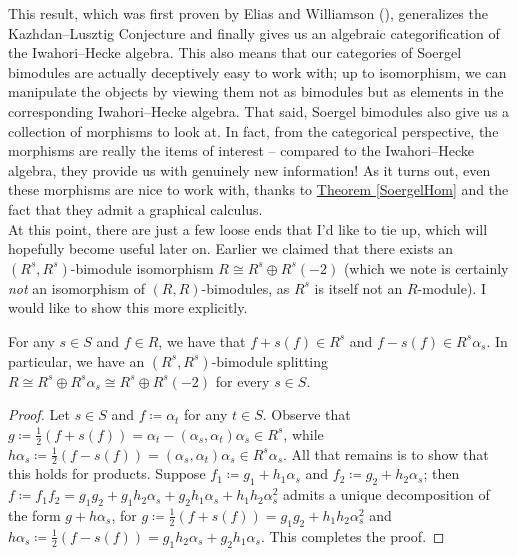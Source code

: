 \noindent This result, which was first proven by Elias and Williamson (\cite[Theorem 1.1]{EW14}), generalizes the Kazhdan--Lusztig Conjecture and finally gives us an algebraic categorification of the Iwahori--Hecke algebra. This also means that our categories of Soergel bimodules are actually deceptively easy to work with; up to isomorphism, we can manipulate the objects by viewing them not as bimodules but as elements in the corresponding Iwahori--Hecke algebra. That said, Soergel bimodules also give us a collection of morphisms to look at. In fact, from the categorical perspective, the morphisms are really the items of interest -- compared to the Iwahori--Hecke algebra, they provide us with genuinely new information! As it turns out, even these morphisms are nice to work with, thanks to \hyperref[SoergelHom]{Theorem \ref*{SoergelHom}} and the fact that they admit a graphical calculus.\\

\noindent At this point, there are just a few loose ends that I'd like to tie up, which will hopefully become useful later on. Earlier we claimed that there exists an $(R^s, R^s)$-bimodule isomorphism $R \cong R^s \oplus R^s(-2)$ (which we note is certainly {\em not} an isomorphism of $(R, R)$-bimodules, as $R^s$ is itself not an $R$-module). I would like to show this more explicitly.\\

\noindent\begin{lemma}\label{RSplitting} For any $s \in S$ and $f \in R$, we have that $f + s(f) \in R^s$ and $f - s(f) \in R^s\alpha_s$. In particular, we have an $(R^s, R^s)$-bimodule splitting $R \cong R^s \oplus R^s\alpha_s \cong R^s \oplus R^s(-2)$ for every $s \in S$.\\
\end{lemma}

\noindent\begin{proof} Let $s \in S$ and $f \coloneqq \alpha_t$ for any $t \in S$. Observe that $g \coloneqq \frac{1}{2}(f + s(f)) = \alpha_t - (\alpha_s, \alpha_t)\alpha_s \in R^s$, while $h\alpha_s \coloneqq \frac{1}{2}(f - s(f)) = (\alpha_s, \alpha_t)\alpha_s \in R^s \alpha_s$. All that remains is to show that this holds for products. Suppose $f_1 \coloneqq g_1 + h_1\alpha_s$ and $f_2 \coloneqq g_2 + h_2\alpha_s$; %
then ${f \coloneqq f_1f_2 = g_1g_2 + g_1h_2\alpha_s + g_2h_1\alpha_s + h_1h_2\alpha_s^2}$ admits a unique decomposition of the form $g + h\alpha_s$, for $g \coloneqq \frac{1}{2}(f + s(f)) = g_1g_2 + h_1h_2\alpha_s^2$ and\linebreak $h\alpha_s \coloneqq \frac{1}{2}(f - s(f)) = g_1h_2\alpha_s + g_2h_1\alpha_s$. This completes the proof.
\end{proof}
\newpage

